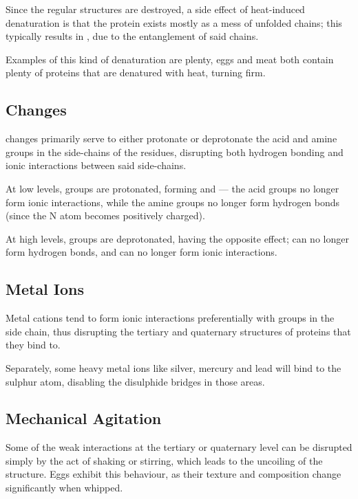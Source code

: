 			Since the regular structures are destroyed, a side effect of heat-induced denaturation is that the protein exists mostly as a mess
			of unfolded chains; this typically results in , due to the entanglement of said chains.

			Examples of this kind of denaturation are plenty, eggs and meat both contain plenty of proteins that are denatured with heat,
			turning firm.



		\subsection{\MpH{} Changes}

			\pH{} changes primarily serve to either protonate or deprotonate the acid and amine groups in the side-chains of the residues,
			disrupting both hydrogen bonding and ionic interactions between said side-chains.

			At low \pH{} levels, groups are protonated, forming  and  --- the acid groups no longer form ionic interactions,
			while the amine groups no longer form hydrogen bonds (since the N atom becomes positively charged).

			At high \pH{} levels, groups are deprotonated, having the opposite effect;  can no longer form hydrogen bonds, and
			 can no longer form ionic interactions.



		\subsection{Metal Ions}

			Metal cations tend to form ionic interactions preferentially with  groups in the side chain, thus disrupting the tertiary
			and quaternary structures of proteins that they bind to.

			Separately, some heavy metal ions like silver, mercury and lead will bind to the sulphur atom, disabling the disulphide bridges in
			those areas.



		\subsection{Mechanical Agitation}

			Some of the weak interactions at the tertiary or quaternary level can be disrupted simply by the act of shaking or stirring,
			which leads to the uncoiling of the structure. Eggs exhibit this behaviour, as their texture and composition change significantly
			when whipped.

